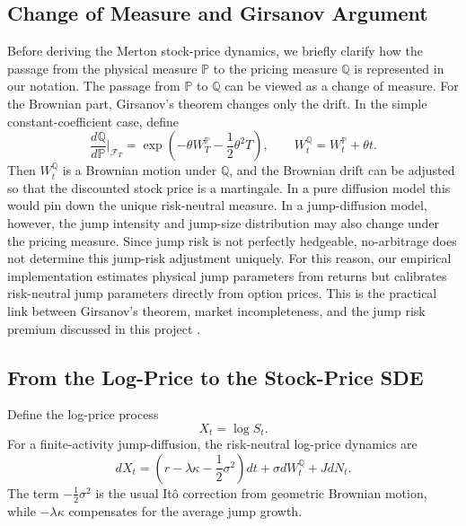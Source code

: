 \documentclass[12pt]{article}
\begin{document}
\subsection*{Change of Measure and Girsanov Argument}

Before deriving the Merton stock-price dynamics, we briefly clarify how the passage from the physical measure $\mathbb{P}$ to the pricing measure $\mathbb{Q}$ is represented in our notation. The passage from $\mathbb{P}$ to $\mathbb{Q}$ can be viewed as a change of measure. For the Brownian part, Girsanov's theorem changes only the drift. In the simple constant-coefficient case, define
\begin{equation}
\frac{d\mathbb{Q}}{d\mathbb{P}}\bigg|_{\mathcal{F}_T}
=\exp\left(-\theta W_T^{\mathbb{P}}-\frac{1}{2}\theta^2T\right),
\qquad
W_t^{\mathbb{Q}}=W_t^{\mathbb{P}}+\theta t.
\label{eq:girsanov_density}
\end{equation}
Then $W_t^{\mathbb{Q}}$ is a Brownian motion under $\mathbb{Q}$, and the Brownian drift can be adjusted so that the discounted stock price is a martingale. In a pure diffusion model this would pin down the unique risk-neutral measure. In a jump-diffusion model, however, the jump intensity and jump-size distribution may also change under the pricing measure. Since jump risk is not perfectly hedgeable, no-arbitrage does not determine this jump-risk adjustment uniquely. For this reason, our empirical implementation estimates physical jump parameters from returns but calibrates risk-neutral jump parameters directly from option prices. This is the practical link between Girsanov's theorem, market incompleteness, and the jump risk premium discussed in this project \citep{Shreve2004}.

\subsection*{From the Log-Price to the Stock-Price SDE}

Define the log-price process
\begin{equation}
X_t=\log S_t.
\label{eq:log_price}
\end{equation}
For a finite-activity jump-diffusion, the risk-neutral log-price dynamics are
\begin{equation}
dX_t=
\left(r-\lambda\kappa-\frac{1}{2}\sigma^2\right)dt
+\sigma dW_t^{\mathbb{Q}}+JdN_t.
\label{eq:log_sde}
\end{equation}
The term $-\frac{1}{2}\sigma^2$ is the usual It\^{o} correction from geometric Brownian motion, while $-\lambda\kappa$ compensates for the average jump growth.
\end{document}
